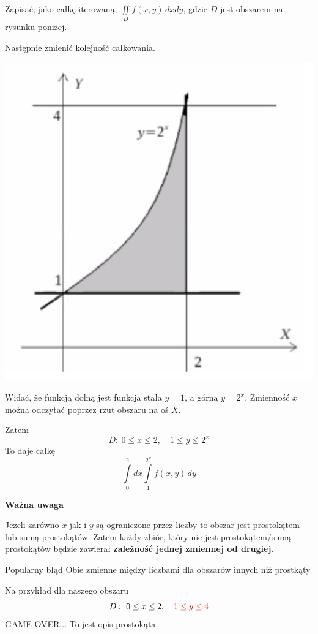 \begin{przykladbig}
Zapisać, jako całkę iterowaną, $ \iint\limits_D f(x,y)\, dxdy $, gdzie $D$ jest obszarem na rysunku poniżej.

Następnie zmienić kolejność całkowania.

\begin{center}
    \includegraphics[scale=0.5]{img/2x.png}
\end{center}

Widać, że funkcją dolną jest funkcja stała $y=1$, a górną $y = 2^x$. Zmienność $x$ można odczytać poprzez rzut obszaru na oś $X$.

Zatem
\[ D: \ 0 \leq x \leq 2, \quad 1 \leq y \leq 2^x \]
To daje całkę 
\[ \int\limits_{0}^{2} dx \int\limits_{1}^{2^x} f(x,y)\, dy \]

\textbf{Ważna uwaga}

Jeżeli zarówno $x$ jak i $y$ są ograniczone przez liczby to obszar jest prostokątem lub sumą prostokątów. Zatem każdy zbiór,
który nie jest prostokątem/sumą prostokątów będzie zawierał \textbf{zależność jednej zmiennej od drugiej}.

\begin{blad}{Popularny błąd}
Obie zmienne między liczbami dla obszarów innych niż prostkąty

Na przykład dla naszego obszaru
\[ D : \ 0 \leq x \leq 2, \quad \textcolor{red}{1 \leq y \leq 4} \]
GAME OVER... To jest opis prostokąta
\end{blad}


\end{przykladbig}
